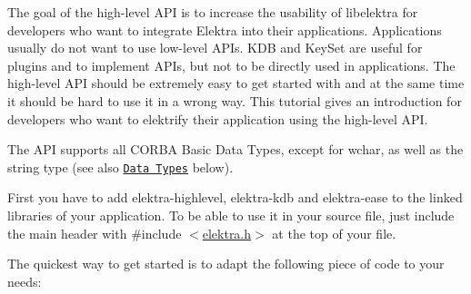 The goal of the high-\/level A\+PI is to increase the usability of libelektra for developers who want to integrate Elektra into their applications. Applications usually do not want to use low-\/level A\+P\+Is. {\ttfamily K\+DB} and {\ttfamily Key\+Set} are useful for plugins and to implement A\+P\+Is, but not to be directly used in applications. The high-\/level A\+PI should be extremely easy to get started with and at the same time it should be hard to use it in a wrong way. This tutorial gives an introduction for developers who want to elektrify their application using the high-\/level A\+PI.

The A\+PI supports all C\+O\+R\+BA Basic Data Types, except for {\ttfamily wchar}, as well as the {\ttfamily string} type (see also \href{#data-types}{\tt Data Types} below).

First you have to add {\ttfamily elektra-\/highlevel}, {\ttfamily elektra-\/kdb} and {\ttfamily elektra-\/ease} to the linked libraries of your application. To be able to use it in your source file, just include the main header with {\ttfamily \#include $<$\hyperlink{elektra_8h}{elektra.\+h}$>$} at the top of your file.

The quickest way to get started is to adapt the following piece of code to your needs\+:




